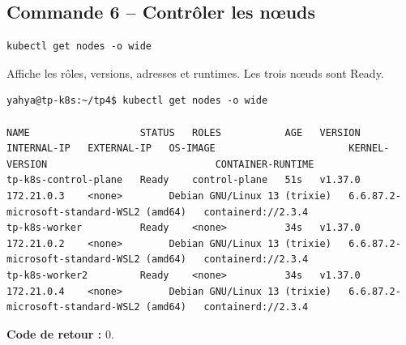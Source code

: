 \documentclass[11pt,a4paper]{article}
\begin{document}
\subsection{Commande 6 -- Contrôler les nœuds}
\begin{lstlisting}
kubectl get nodes -o wide
\end{lstlisting}
Affiche les rôles, versions, adresses et runtimes. Les trois nœuds sont Ready.
\begin{tcolorbox}[terminal,title={Ubuntu / WSL2 -- Commande 6 -- rendu reconstitué}]
\begin{Verbatim}[fontsize=\scriptsize,breaklines=true,breakanywhere=true,breaksymbolleft={},breaksymbolright={}]
yahya@tp-k8s:~/tp4$ kubectl get nodes -o wide

NAME                   STATUS   ROLES           AGE   VERSION   INTERNAL-IP   EXTERNAL-IP   OS-IMAGE                       KERNEL-VERSION                             CONTAINER-RUNTIME
tp-k8s-control-plane   Ready    control-plane   51s   v1.37.0   172.21.0.3    <none>        Debian GNU/Linux 13 (trixie)   6.6.87.2-microsoft-standard-WSL2 (amd64)   containerd://2.3.4
tp-k8s-worker          Ready    <none>          34s   v1.37.0   172.21.0.2    <none>        Debian GNU/Linux 13 (trixie)   6.6.87.2-microsoft-standard-WSL2 (amd64)   containerd://2.3.4
tp-k8s-worker2         Ready    <none>          34s   v1.37.0   172.21.0.4    <none>        Debian GNU/Linux 13 (trixie)   6.6.87.2-microsoft-standard-WSL2 (amd64)   containerd://2.3.4
\end{Verbatim}
\end{tcolorbox}
\textbf{Code de retour :} 0.
\end{document}

